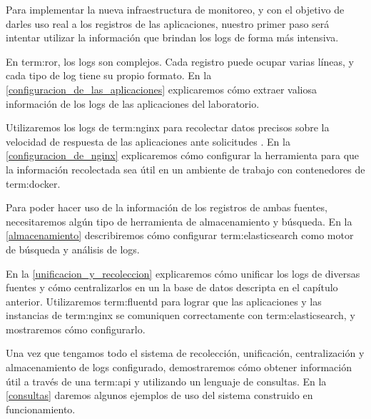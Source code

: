 Para implementar la nueva infraestructura de monitoreo, y con el objetivo de
darles uso real a los registros de las aplicaciones, nuestro primer paso será
intentar utilizar la información que brindan los logs de forma más intensiva.

En \gls{term:ror}, los logs son complejos. Cada registro puede ocupar varias
líneas, y cada tipo de log tiene su propio formato. En la
\autoref{configuracion_de_las_aplicaciones} explicaremos cómo extraer valiosa
información de los logs de las aplicaciones del laboratorio.

Utilizaremos los logs de \gls{term:nginx} para recolectar datos precisos sobre
la velocidad de respuesta de las aplicaciones ante solicitudes .  En
la \autoref{configuracion_de_nginx} explicaremos cómo configurar la herramienta
para que la información recolectada sea útil en un ambiente de trabajo con
contenedores de \gls{term:docker}.

Para poder hacer uso de la información de los registros de ambas fuentes,
necesitaremos algún tipo de herramienta de almacenamiento y búsqueda. En la
\autoref{almacenamiento} describiremos cómo configurar \gls{term:elasticsearch}
como motor de búsqueda y análisis de logs.

En la \autoref{unificacion_y_recoleccion} explicaremos cómo unificar los logs
de diversas fuentes y cómo centralizarlos en un la base de datos descripta en
el capítulo anterior.  Utilizaremos \gls{term:fluentd} para lograr que las
aplicaciones y las instancias de \gls{term:nginx} se comuniquen correctamente
con \gls{term:elasticsearch}, y mostraremos cómo configurarlo.

Una vez que tengamos todo el sistema de recolección, unificación,
centralización y almacenamiento de logs configurado, demostraremos cómo obtener
información útil a través de una \gls{term:api} y utilizando un lenguaje de
consultas. En la \autoref{consultas} daremos algunos ejemplos de uso del
sistema construido en funcionamiento.

